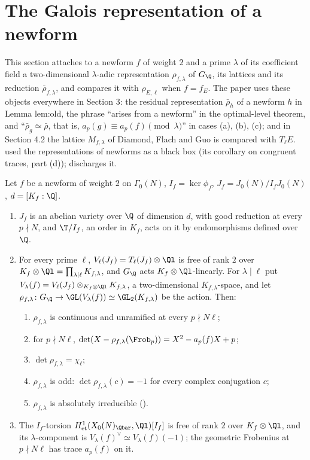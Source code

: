 \section{The Galois representation of a newform}\label{sec:modgalrep:galrep}

This section attaches to a newform $f$ of weight $2$ and a prime $\lambda$ of its coefficient field a two-dimensional $\lambda$-adic representation
$\rho_{f,\lambda}$ of $G_\Q$, its lattices and its reduction $\bar\rho_{f,\lambda}$, and compares it with $\rho_{E,\ell}$ when $f=f_E$. The paper uses these objects
everywhere in Section 3: the residual representation $\bar\rho_h$ of a newform $h$ in Lemma lem:old, the phrase ``arises from a newform'' in the
optimal-level theorem, and ``$\bar\rho_g\simeq\bar\rho$, that is, $a_p(g)\equiv a_p(f)\pmod\lambda$'' in cases (a), (b), (c); and in Section 4.2 the lattice
$M_{f,\lambda}$ of Diamond, Flach and Guo is compared with $T_\ell E$.  used the representations of newforms as a black box
(its corollary on congruent traces, part (d));  discharges it.

\begin{theorem}\label{thm:modgalrep:eichler-shimura}
Let $f$ be a newform of weight $2$ on $\Gamma_0(N)$, $I_f=\ker\phi_f$, $J_f=J_0(N)/I_fJ_0(N)$, $d=[K_f:\Q]$.
\begin{enumerate}[label=(\roman*)]
\item $J_f$ is an abelian variety over $\Q$ of dimension $d$, with good reduction at every $p\nmid N$, and $\T/I_f$, an order in $K_f$, acts on it by
endomorphisms defined over $\Q$.
\item For every prime $\ell$, $V_\ell(J_f)=T_\ell(J_f)\otimes\Ql$ is free of rank $2$ over $K_f\otimes\Ql=\prod_{\lambda\mid\ell}K_{f,\lambda}$, and $G_\Q$ acts $K_f\otimes\Ql$-linearly. For
$\lambda\mid\ell$ put $V_\lambda(f)=V_\ell(J_f)\otimes_{K_f\otimes\Ql}K_{f,\lambda}$, a two-dimensional $K_{f,\lambda}$-space, and let $\rho_{f,\lambda}\colon G_\Q\to\GL(V_\lambda(f))\simeq\GL_2(K_{f,\lambda})$ be the
action. Then:
\begin{enumerate}[label=(\alph*)]
\item $\rho_{f,\lambda}$ is continuous and unramified at every $p\nmid N\ell$;
\item for $p\nmid N\ell$, $\det(X-\rho_{f,\lambda}(\Frob_p))=X^2-a_p(f)X+p$;
\item $\det\rho_{f,\lambda}=\chi_\ell$;
\item $\rho_{f,\lambda}$ is odd: $\det\rho_{f,\lambda}(c)=-1$ for every complex conjugation $c$;
\item $\rho_{f,\lambda}$ is absolutely irreducible ().
\end{enumerate}
\item The $I_f$-torsion $H^1_{\mathrm{et}}(X_0(N)_{\Qbar},\Ql)[I_f]$ is free of rank $2$ over $K_f\otimes\Ql$, and its $\lambda$-component is $V_\lambda(f)^\vee\simeq V_\lambda(f)(-1)$; the
geometric Frobenius at $p\nmid N\ell$ has trace $a_p(f)$ on it.
\end{enumerate}
\end{theorem}

